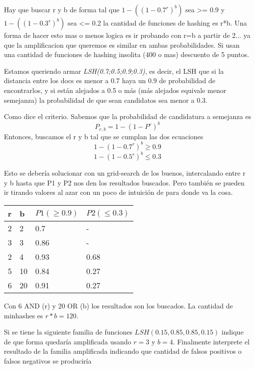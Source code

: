 \documentclass[a4paper]{article}
\newenvironment{enunciado}[3]{%
    \vspace{\baselineskip}
    \tcolorbox[beamer,%
    noparskip,breakable,
    colback=LightGreen,colframe=DarkGreen,%
    colbacklower=LimeGreen!75!LightGreen,%
    title=\small Enunciado: Año #1\, Cuatrimestre #2\, Oportunidad #3]}%
    {\endtcolorbox}
\newenvironment{criterio}[3]{%
    \tcolorbox[beamer,%
    noparskip,breakable,
    colback=LightCoral,colframe=DarkRed,%
    colbacklower=Tomato!75!LightCoral,%
    title=\small Criterio de Corrección: Año #1\, Cuatrimestre #2\, Oportunidad #3]}%
    {\endtcolorbox}
\begin{document}
    \begin{criterio}{2014}{1}{1}
        Hay que buscar r y b de forma tal que $1 - ((1-0.7^r)^b)$ sea >= 0.9 y $1-((1-0.3^r)^b)$ sea <= 0.2 la cantidad de funciones de hashing es r*b. Una forma de hacer esto mas o menos logica es ir probando con r=b a partir de 2... ya que la amplificacion que queremos es similar en ambas probabilidades. Si usan una cantidad de funciones de hashing insolita (400 o mas) descuento de 5 puntos. 
    \end{criterio}

    Estamos queriendo armar \textit{LSH(0.7;0.5;0.9;0.3)}, es decir, el LSH que si la distancia entre los docs es menor a 0.7 haya un 0.9 de probabilidad de encontrarlos, y si están alejados a 0.5 o más (más alejados equivale menor semejanza) la probabilidad de que sean candidatos sea menor a 0.3.
    
    Como dice el criterio. Sabemos que la probabilidad de candidatura a semejanza es $$P_{r,b} = 1 - (1 - P^r)^b$$ Entonces, buscamos el r y b tal que se cumplan las dos ecuaciones $$1 - (1 - 0.7^r)^b \geq 0.9$$ $$1 - (1 - 0.5^r)^b \leq 0.3$$

    Esto se debería solucionar con un grid-search de los buenos, intercalando entre r y b hasta que P1 y P2 nos den los resultados buscados. Pero también se pueden ir tirando valores al azar con un poco de intuición de para donde va la cosa.  

    \begin{table}[H]
        \begin{tabular}{|l|l|l|l|}
        \hline
        r & b  & $P1 (\geq 0.9)$   & $P2 (\leq 0.3)$   \\
        \hline
        2 & 2  & 0.7  & -    \\
        3 & 3  & 0.86 & -    \\
        2 & 4  & 0.93 & 0.68    \\
        5 & 10 & 0.84 & 0.27 \\
        6 & 20 & 0.91 & 0.27 \\
        \hline
        \end{tabular}
    \end{table}

    Con 6 AND (r) y 20 OR (b) los resultados son los buscados. La cantidad de minhashes es $r*b=120$.

    \begin{enunciado}{2014}{2}{1}
        Si   se   tiene   la   siguiente   familia   de   funciones     $LSH(0.15,0.85,0.85,0.15)$   indique   de   que   forma   quedaría amplificada   usando   $r=3$   y   $b=4$.   Finalmente   interprete   el resultado de la familia amplificada indicando que cantidad de falsos  positivos  o falsos  negativos  se produciría
    \end{enunciado}
\end{document}
